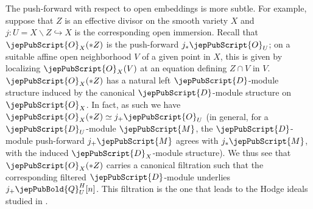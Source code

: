 The push-forward with respect to open embeddings is more subtle. For example, suppose that $Z$ is an effective divisor
on the smooth variety $X$ and $j\colon U=X\smallsetminus Z\hookrightarrow X$ is the corresponding open immersion. 
Recall that $\jepPubScript{O}_X(*Z)$
is the push-forward $j_*\jepPubScript{O}_U$; on a suitable affine open neighborhood $V$ of a given point in $X$, this is given by localizing $\jepPubScript{O}_X(V)$ at 
an equation defining $Z\cap V$ in $V$.
$\jepPubScript{O}_X(*Z)$ has a natural left $\jepPubScript{D}$-module structure induced by the canonical $\jepPubScript{D}$-module structure on $\jepPubScript{O}_X$. In fact, as such
we have $\jepPubScript{O}_X(*Z)\simeq j_+\jepPubScript{O}_U$  (in general, for a $\jepPubScript{D}_U$-module $\jepPubScript{M}$, the $\jepPubScript{D}$-module push-forward
 $j_+\jepPubScript{M}$ agrees with $j_*\jepPubScript{M}$, with the induced $\jepPubScript{D}_X$-module structure).
We thus see that $\jepPubScript{O}_X(*Z)$ carries a canonical filtration such that the corresponding
filtered $\jepPubScript{D}$-module underlies $j_+\jepPubBold{Q}_U^H[n]$. This filtration is the one that leads to the Hodge ideals studied in \cite{MP1}.




